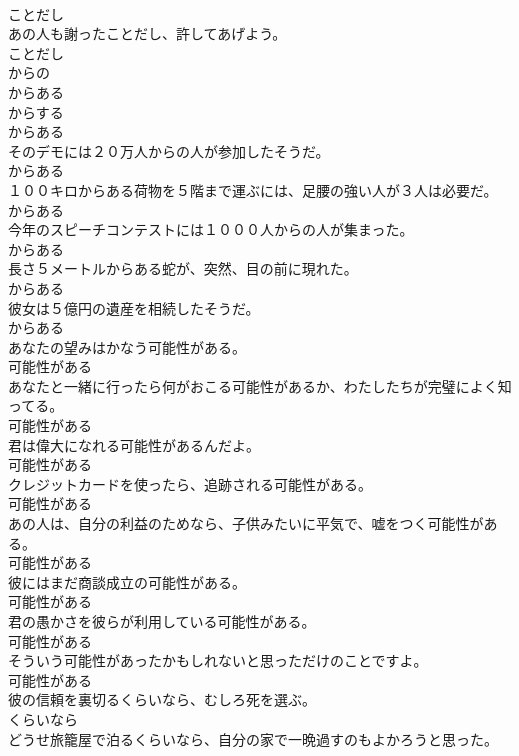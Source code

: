 \documentclass[8pt]{extreport}
\begin{document}
\begin{CJK}{UTF8}{min}
\\	ことだし
\\	あの人も謝ったことだし、許してあげよう。	
\\	ことだし
\\	からの 
\\	からある 
\\	からする 
\\	からある
\\	そのデモには２０万人からの人が参加したそうだ。	
\\	からある
\\	１００キロからある荷物を５階まで運ぶには、足腰の強い人が３人は必要だ。	
\\	からある
\\	今年のスピーチコンテストには１０００人からの人が集まった。	
\\	からある
\\	長さ５メートルからある蛇が、突然、目の前に現れた。	
\\	からある
\\	彼女は５億円の遺産を相続したそうだ。	
\\	からある
\\	あなたの望みはかなう可能性がある。	
\\	可能性がある
\\	あなたと一緒に行ったら何がおこる可能性があるか、わたしたちが完璧によく知ってる。	
\\	可能性がある
\\	君は偉大になれる可能性があるんだよ。	
\\	可能性がある
\\	クレジットカードを使ったら、追跡される可能性がある。	
\\	可能性がある
\\	あの人は、自分の利益のためなら、子供みたいに平気で、嘘をつく可能性がある。	
\\	可能性がある
\\	彼にはまだ商談成立の可能性がある。	
\\	可能性がある
\\	君の愚かさを彼らが利用している可能性がある。	
\\	可能性がある
\\	そういう可能性があったかもしれないと思っただけのことですよ。	
\\	可能性がある
\\	彼の信頼を裏切るくらいなら、むしろ死を選ぶ。	
\\	くらいなら
\\	どうせ旅籠屋で泊るくらいなら、自分の家で一晩過すのもよかろうと思った。	

\end{CJK}
\end{document}
